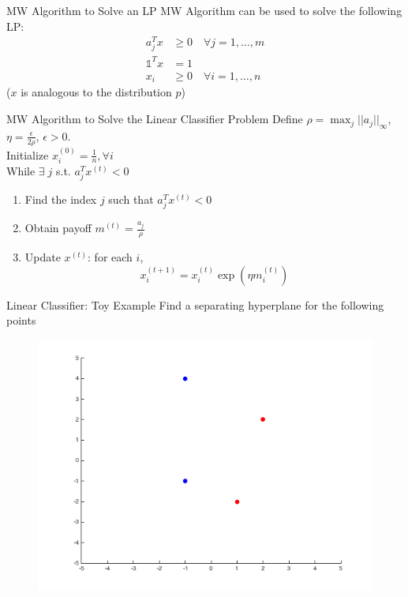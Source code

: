 \documentclass{beamer}
\begin{document}
\begin{frame}{MW Algorithm to Solve an LP}
MW Algorithm can be used to solve the following LP:
\begin{align*}
a_j^Tx &\geq 0 \quad \forall j = 1,\ldots,m \\
\mathds{1}^Tx &= 1 \\
x_i &\geq 0 \quad \forall i = 1,\ldots,n
\end{align*}
($x$ is analogous to the distribution $p$)\\
\end{frame}

\begin{frame}{MW Algorithm to Solve the Linear Classifier Problem}
Define $\rho = \max_j ||a_j||_\infty$, $\eta = \frac{\epsilon}{2\rho}$, $\epsilon > 0$. \\ \vspace{.5cm}
Initialize $x_i^{(0)} = \frac{1}{n}, \forall i$\\ \vspace{.5cm}
While $\exists \; j$ s.t. $a_j^T x^{(t)} < 0$
\begin{enumerate}
\setlength\itemsep{1.2em}
\item Find the index $j$ such that $a_j^Tx^{(t)} <0$
\item Obtain payoff $m^{(t)} = \frac{a_j}{\rho}$
\item Update $x^{(t)}$: for each $i$,
$$ x_i^{(t+1)} = x_i^{(t)}\exp(\eta m_i^{(t)})$$
\end{enumerate}
\end{frame}

\begin{frame}{Linear Classifier: Toy Example}
Find a separating hyperplane for the following points
\begin{figure}
\includegraphics[width=\textwidth]{ClassifierToy_scatter.png}
\end{figure}
\end{frame}
\end{document}

